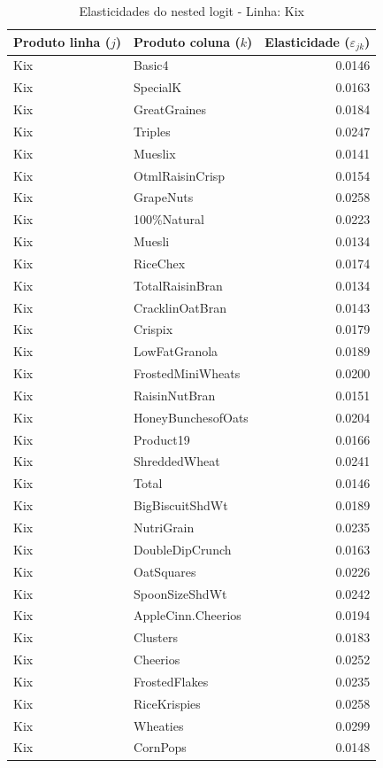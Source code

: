 \begingroup
\begin{table}[H]
\centering
\caption{Elasticidades do nested logit - Linha: Kix}
\label{tab:elas-nested-kix}
\small
\begin{tabular}{llr}
\toprule
Produto linha ($j$) & Produto coluna ($k$) & Elasticidade ($\varepsilon_{jk}$) \\
\midrule
Kix & Basic4 & 0.0146 \\
Kix & SpecialK & 0.0163 \\
Kix & GreatGraines & 0.0184 \\
Kix & Triples & 0.0247 \\
Kix & Mueslix & 0.0141 \\
Kix & OtmlRaisinCrisp & 0.0154 \\
Kix & GrapeNuts & 0.0258 \\
Kix & 100\%Natural & 0.0223 \\
Kix & Muesli & 0.0134 \\
Kix & RiceChex & 0.0174 \\
Kix & TotalRaisinBran & 0.0134 \\
Kix & CracklinOatBran & 0.0143 \\
Kix & Crispix & 0.0179 \\
Kix & LowFatGranola & 0.0189 \\
Kix & FrostedMiniWheats & 0.0200 \\
Kix & RaisinNutBran & 0.0151 \\
Kix & HoneyBunchesofOats & 0.0204 \\
Kix & Product19 & 0.0166 \\
Kix & ShreddedWheat & 0.0241 \\
Kix & Total & 0.0146 \\
Kix & BigBiscuitShdWt & 0.0189 \\
Kix & NutriGrain & 0.0235 \\
Kix & DoubleDipCrunch & 0.0163 \\
Kix & OatSquares & 0.0226 \\
Kix & SpoonSizeShdWt & 0.0242 \\
Kix & AppleCinn.Cheerios & 0.0194 \\
Kix & Clusters & 0.0183 \\
Kix & Cheerios & 0.0252 \\
Kix & FrostedFlakes & 0.0235 \\
Kix & RiceKrispies & 0.0258 \\
Kix & Wheaties & 0.0299 \\
Kix & CornPops & 0.0148 \\

\end{tabular}
\end{table}
